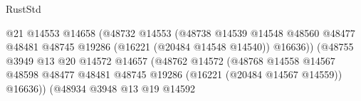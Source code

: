 \begin{lexlean}{RustStd}
\begin{coremodule}
                                                          @21
                                                          @14553
                                                          @14658
                                                          (@48732
                                                            @14553
                                                            (@48738
                                                              @14539
                                                              @14548
                                                              @48560
                                                              @48477
                                                              @48481
                                                              @48745
                                                              @19286
                                                              (@16221 (@20484 @14548 @14540))
                                                              @16636))
                                                          (@48755
                                                            @3949
                                                            @13
                                                            @20
                                                            @14572
                                                            @14657
                                                            (@48762
                                                              @14572
                                                              (@48768
                                                                @14558
                                                                @14567
                                                                @48598
                                                                @48477
                                                                @48481
                                                                @48745
                                                                @19286
                                                                (@16221 (@20484 @14567 @14559))
                                                                @16636))
                                                            (@48934
                                                              @3948
                                                              @13
                                                              @19
                                                              @14592

\end{coremodule}
\end{lexlean}
